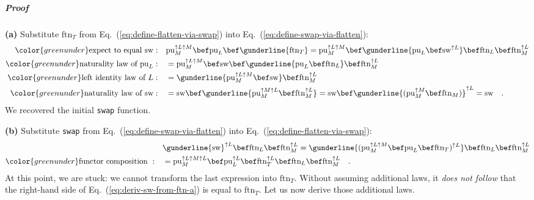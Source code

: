 \subparagraph{Proof}

\textbf{(a)} Substitute $\text{ftn}_{T}$ from Eq.~(\ref{eq:define-flatten-via-swap})
into Eq.~(\ref{eq:define-swap-via-flatten}):
\begin{align*}
{\color{greenunder}\text{expect to equal }\text{sw}:}\quad & \text{pu}_{M}^{\uparrow L\uparrow M}\bef\text{pu}_{L}\bef\gunderline{\text{ftn}_{T}}=\text{pu}_{M}^{\uparrow L\uparrow M}\bef\gunderline{\text{pu}_{L}\bef\text{sw}^{\uparrow L}}\bef\text{ftn}_{L}\bef\text{ftn}_{M}^{\uparrow L}\\
{\color{greenunder}\text{naturality law of }\text{pu}_{L}:}\quad & =\text{pu}_{M}^{\uparrow L\uparrow M}\bef\text{sw}\bef\gunderline{\text{pu}_{L}\bef\text{ftn}_{L}}\bef\text{ftn}_{M}^{\uparrow L}\\
{\color{greenunder}\text{left identity law of }L:}\quad & =\gunderline{\text{pu}_{M}^{\uparrow L\uparrow M}\bef\text{sw}}\bef\text{ftn}_{M}^{\uparrow L}\\
{\color{greenunder}\text{naturality law of }\text{sw}:}\quad & =\text{sw}\bef\gunderline{\text{pu}_{M}^{\uparrow M\uparrow L}\bef\text{ftn}_{M}^{\uparrow L}}=\text{sw}\bef\gunderline{(\text{pu}_{M}^{\uparrow M}\bef\text{ftn}_{M})}^{\uparrow L}=\text{sw}\quad.
\end{align*}
We recovered the initial \lstinline!swap! function.

\textbf{(b)} Substitute \lstinline!swap! from Eq.~(\ref{eq:define-swap-via-flatten})
into Eq.~(\ref{eq:define-flatten-via-swap}):
\begin{align}
 & \gunderline{\text{sw}}^{\uparrow L}\bef\text{ftn}_{L}\bef\text{ftn}_{M}^{\uparrow L}=\gunderline{(\text{pu}_{M}^{\uparrow L\uparrow M}\bef\text{pu}_{L}\bef\text{ftn}_{T})^{\uparrow L}}\bef\text{ftn}_{L}\bef\text{ftn}_{M}^{\uparrow L}\nonumber \\
{\color{greenunder}\text{functor composition }:}\quad & =\text{pu}_{M}^{\uparrow L\uparrow M\uparrow L}\bef\text{pu}_{L}^{\uparrow L}\bef\text{ftn}_{T}^{\uparrow L}\bef\text{ftn}_{L}\bef\text{ftn}_{M}^{\uparrow L}\quad.\label{eq:deriv-sw-from-ftn-a}
\end{align}
At this point, we are stuck: we cannot transform the last expression
into $\text{ftn}_{T}$. Without assuming additional laws, it \emph{does
not follow} that the right-hand side of Eq.~(\ref{eq:deriv-sw-from-ftn-a})
is equal to $\text{ftn}_{T}$. Let us now derive those additional
laws. 

